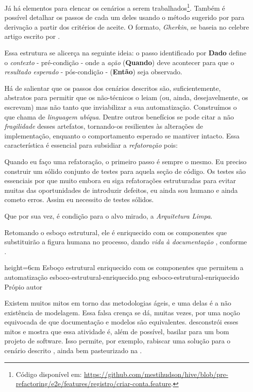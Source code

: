   Já há elementos para elencar os cenários a serem trabalhados\footnote{Código disponível em: \url{https://github.com/mestihudson/hive/blob/pre-refactoring/e2e/features/registro/criar-conta.feature}.}. Também é possível detalhar os passos de cada um deles usando o método sugerido por  para derivação a partir dos critérios de aceite. O formato, \emph{Gherkin}, se baseia no celebre artigo escrito por .

  Essa estrutura se alicerça na seguinte ideia: o passo identificado por \textbf{Dado} define o \emph{contexto} - pré-condição - onde a \emph{ação} (\textbf{Quando}) deve acontecer para que o \emph{resultado esperado} - pós-condição - (\textbf{Então}) seja observado.

  Há de salientar que os passos dos cenários descritos são, suficientemente, abstratos para permitir que os não-técnicos o leiam (ou, ainda, desejavelmente, os escrevam) mas não tanto que inviabilizar a sua automatização. Construímos o que  chama de \emph{linguagem ubíqua}. Dentre outros benefícios se pode citar a não \emph{fragilidade}\cite[pág. 93, tradução nossa]{RoseWynneHellesoy2015} desses artefatos, tornando-os resilientes às alterações de implementação, enquanto o comportamento esperado se mantiver intacto. Essa característica é essencial para subsidiar a \emph{refatoração} pois:

  \citacaolonga
    {Quando eu faço uma refatoração, o primeiro passo é sempre o mesmo. Eu preciso construir um sólido conjunto de testes para aquela seção de código. Os testes são essenciais por que muito embora eu siga refatorações estruturadas para evitar muitas das oportunidades de introduzir defeitos, eu ainda sou humano e ainda cometo erros. Assim eu necessito de testes sólidos.}
    {\cite[p.  17, tradução nossa]{Fowler1999}}

  Que por sua vez, é condição para o alvo mirado, a \emph{Arquitetura Limpa}.

  Retomando o esboço estrutural, ele é enriquecido com os componentes que substituirão a figura humana no processo, dando \emph{vida à documentação} \cite[pág. 29, tradução nossa]{Adzic2011}, conforme .

  \imagem
    {height=6cm}
    {Esboço estrutural enriquecido com os componentes que permitem a automatização}
    {esboco-estrutural-enriquecido.png}
    {esboco-estrutural-enriquecido}
    {Própio autor}

  Existem muitos mitos em torno das metodologias ágeis, e uma delas é a não existência de modelagem. Essa falsa crença se dá, muitas vezes, por uma noção equivocada de que documentação e modelos são equivalentes.  desconstrói esses mitos e mostra que essa atividade é, além de possível, basilar para um bom projeto de software. Isso permite, por exemplo, rabiscar uma solução para o cenário descrito \cite[pág. 57]{Ruby2011}, ainda bem pasteurizado na .

